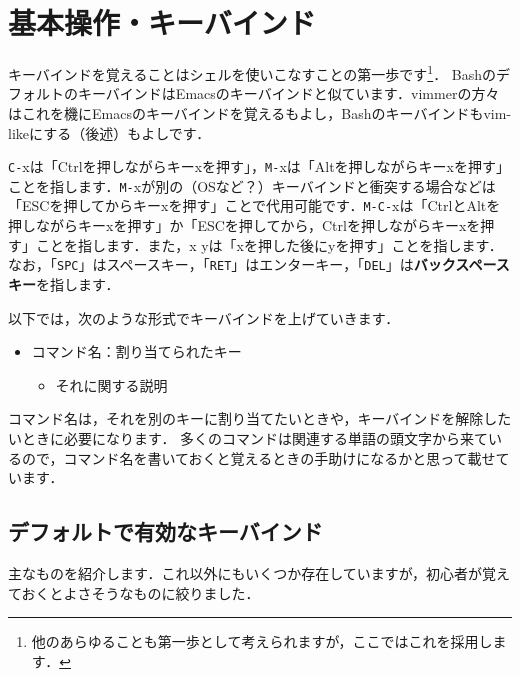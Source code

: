 \section{基本操作・キーバインド}
キーバインドを覚えることはシェルを使いこなすことの第一歩です\footnote{他のあらゆることも第一歩として考えられますが，ここではこれを採用します．}．
BashのデフォルトのキーバインドはEmacsのキーバインドと似ています．vimmerの方々はこれを機にEmacsのキーバインドを覚えるもよし，Bashのキーバインドもvim-likeにする（後述）もよしです．

\texttt{C-}xは「Ctrlを押しながらキーxを押す」，\texttt{M-}xは「Altを押しながらキーxを押す」ことを指します．\texttt{M-}xが別の（OSなど？）キーバインドと衝突する場合などは「ESCを押してからキーxを押す」ことで代用可能です．\texttt{M-C-}xは「CtrlとAltを押しながらキーxを押す」か「ESCを押してから，Ctrlを押しながらキーxを押す」ことを指します．また，x yは「xを押した後にyを押す」ことを指します．
なお，「\texttt{SPC}」はスペースキー，「\texttt{RET}」はエンターキー，「\texttt{DEL}」は\textbf{バックスペースキー}を指します．

以下では，次のような形式でキーバインドを上げていきます．
\begin{itemize}
\item コマンド名：割り当てられたキー
  \begin{itemize}
  \item それに関する説明
  \end{itemize}
\end{itemize}
コマンド名は，それを別のキーに割り当てたいときや，キーバインドを解除したいときに必要になります．
多くのコマンドは関連する単語の頭文字から来ているので，コマンド名を書いておくと覚えるときの手助けになるかと思って載せています．

\subsection{デフォルトで有効なキーバインド}
主なものを紹介します．これ以外にもいくつか存在していますが，初心者が覚えておくとよさそうなものに絞りました．

